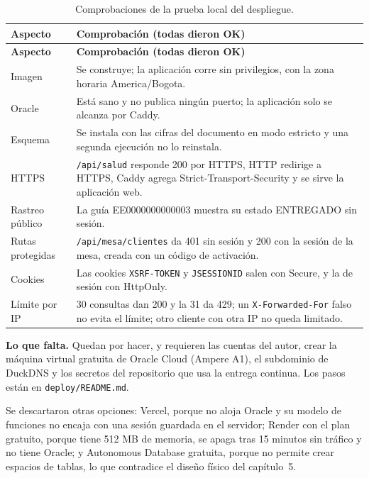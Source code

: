 {\singlespacing\small
\begin{longtable}{L{4.0cm} L{9.2cm}}
\caption{Comprobaciones de la prueba local del despliegue.}
\label{tab:proto-despliegue}\\
\toprule
\textbf{Aspecto} & \textbf{Comprobación (todas dieron OK)} \\
\midrule
\endfirsthead
\toprule
\textbf{Aspecto} & \textbf{Comprobación (todas dieron OK)} \\
\midrule
\endhead
\bottomrule
\endfoot
Imagen & Se construye; la aplicación corre sin privilegios, con la zona horaria America/Bogota. \\
Oracle & Está sano y no publica ningún puerto; la aplicación solo se alcanza por Caddy. \\
Esquema & Se instala con las cifras del documento en modo estricto y una segunda ejecución no lo reinstala. \\
HTTPS & \texttt{/api/salud} responde 200 por HTTPS, HTTP redirige a HTTPS, Caddy agrega Strict-Transport-Security y se sirve la aplicación web. \\
Rastreo público & La guía EE0000000000003 muestra su estado ENTREGADO sin sesión. \\
Rutas protegidas & \texttt{/api/mesa/clientes} da 401 sin sesión y 200 con la sesión de la mesa, creada con un código de activación. \\
Cookies & Las cookies \texttt{XSRF-TOKEN} y \texttt{JSESSIONID} salen con Secure, y la de sesión con HttpOnly. \\
Límite por IP & 30 consultas dan 200 y la 31 da 429; un \texttt{X-Forwarded-For} falso no evita el límite; otro cliente con otra IP no queda limitado. \\
\end{longtable}
\par}

\textbf{Lo que falta.} Quedan por hacer, y requieren las cuentas del autor,
crear la máquina virtual gratuita de Oracle Cloud (Ampere A1), el subdominio
de DuckDNS y los secretos del repositorio que usa la entrega continua. Los pasos
están en \texttt{deploy/README.md}.

Se descartaron otras opciones: Vercel, porque no aloja Oracle y su modelo de
funciones no encaja con una sesión guardada en el servidor; Render con el plan
gratuito, porque tiene 512 MB de memoria, se apaga tras 15 minutos sin
tráfico y no tiene Oracle; y Autonomous Database gratuita, porque no permite
crear espacios de tablas, lo que contradice el diseño físico del
capítulo~5.

